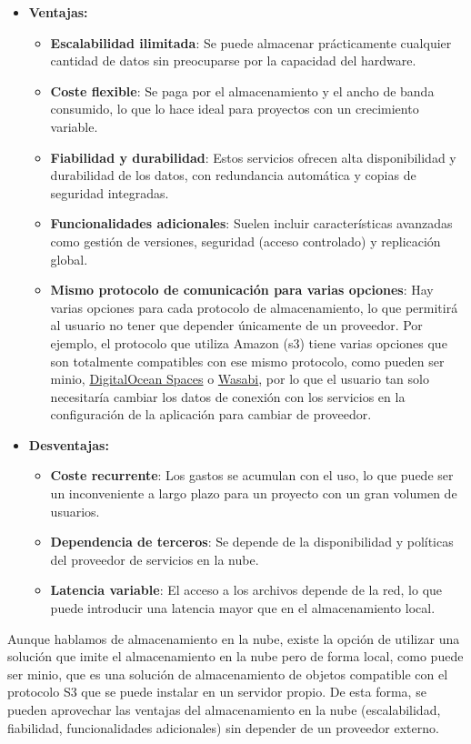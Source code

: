 \begin{itemize}
\item \textbf{Ventajas:}
    \begin{itemize}
        \item \textbf{Escalabilidad ilimitada}: Se puede almacenar prácticamente cualquier cantidad de datos sin preocuparse por la capacidad del hardware.
        \item \textbf{Coste flexible}: Se paga por el almacenamiento y el ancho de banda consumido, lo que lo hace ideal para proyectos con un crecimiento variable.
        \item \textbf{Fiabilidad y durabilidad}: Estos servicios ofrecen alta disponibilidad y durabilidad de los datos, con redundancia automática y copias de seguridad integradas.
        \item \textbf{Funcionalidades adicionales}: Suelen incluir características avanzadas como gestión de versiones, seguridad (acceso controlado) y replicación global.
        \item \textbf{Mismo protocolo de comunicación para varias opciones}: Hay varias opciones para cada protocolo de almacenamiento, lo que permitirá al usuario no tener que depender únicamente de un proveedor. Por ejemplo, el protocolo que utiliza Amazon (\gls{s3}) tiene varias opciones que son totalmente compatibles con ese mismo protocolo, como pueden ser \gls{minio}, \href{https://www.digitalocean.com/products/spaces}{DigitalOcean Spaces} o \href{https://wasabi.com/es}{Wasabi}, por lo que el usuario tan solo necesitaría cambiar los datos de conexión con los servicios en la configuración de la aplicación para cambiar de proveedor.
    \end{itemize}
\item \textbf{Desventajas:}
\begin{itemize}
\item \textbf{Coste recurrente}: Los gastos se acumulan con el uso, lo que puede ser un inconveniente a largo plazo para un proyecto con un gran volumen de usuarios.
\item \textbf{Dependencia de terceros}: Se depende de la disponibilidad y políticas del proveedor de servicios en la nube.
\item \textbf{Latencia variable}: El acceso a los archivos depende de la red, lo que puede introducir una latencia mayor que en el almacenamiento local.
\end{itemize}
\end{itemize}

Aunque hablamos de almacenamiento en la nube, existe la opción de utilizar una solución que imite el almacenamiento en la nube pero de forma local, como puede ser \gls{minio}, que es una solución de almacenamiento de objetos compatible con el protocolo S3 que se puede instalar en un servidor propio. De esta forma, se pueden aprovechar las ventajas del almacenamiento en la nube (escalabilidad, fiabilidad, funcionalidades adicionales) sin depender de un proveedor externo.

